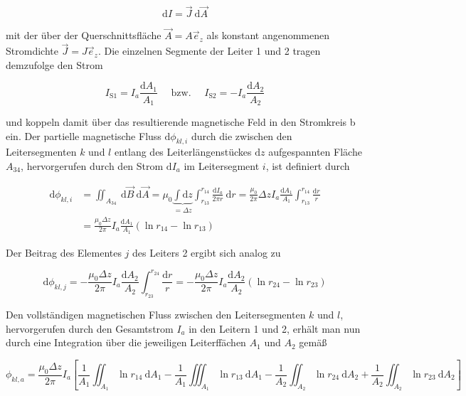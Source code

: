 \begin{equation}
	\mathrm{d} I=\vec{J} \mathrm{~d} \vec{A} 
\end{equation}


mit der über der Querschnittsfläche $\vec{A}=A \vec{e}_{z}$ als konstant angenommenen Stromdichte $\vec{J}=J \vec{e}_{z}$. Die einzelnen Segmente der Leiter 1 und 2 tragen demzufolge den Strom


\begin{equation}
	I_{\mathrm{S} 1}=I_{a} \frac{\mathrm{d} A_{1}}{A_{1}} \quad \text { bzw. } \quad I_{\mathrm{S} 2}=-I_{a} \frac{\mathrm{d} A_{2}}{A_{2}} 
\end{equation}


und koppeln damit über das resultierende magnetische Feld in den Stromkreis b ein. Der partielle magnetische Fluss $\mathrm{d} \phi_{k l, i}$ durch die zwischen den Leitersegmenten $k$ und $l$ entlang des Leiterlängenstückes $\mathrm{d} z$ aufgespannten Fläche $A_{34}$, hervorgerufen durch den Strom $\mathrm{d} I_{a}$ im Leitersegment $i$, ist definiert durch


\begin{align}
	\mathrm{d} \phi_{k l, i} & =\iint_{A_{34}} \mathrm{~d} \vec{B} \mathrm{~d} \vec{A}=\mu_{0} \underbrace{\int \mathrm{d} z}_{=\Delta z} \int_{r_{13}}^{r_{14}} \frac{\mathrm{d} I_{a}}{2 \pi r} \mathrm{~d} r=\frac{\mu_{0}}{2 \pi} \Delta z I_{a} \frac{\mathrm{d} A_{1}}{A_{1}} \int_{r_{13}}^{r_{14}} \frac{\mathrm{d} r}{r}  \\
	& =\frac{\mu_{0} \Delta z}{2 \pi} I_{a} \frac{\mathrm{d} A_{1}}{A_{1}}\left(\ln r_{14}-\ln r_{13}\right) 
\end{align}


Der Beitrag des Elementes $j$ des Leiters 2 ergibt sich analog zu


\begin{equation}
	\mathrm{d} \phi_{k l, j}=-\frac{\mu_{0} \Delta z}{2 \pi} I_{a} \frac{\mathrm{d} A_{2}}{A_{2}} \int_{r_{23}}^{r_{24}} \frac{\mathrm{d} r}{r}=-\frac{\mu_{0} \Delta z}{2 \pi} I_{a} \frac{\mathrm{d} A_{2}}{A_{2}}\left(\ln r_{24}-\ln r_{23}\right) 
\end{equation}

Den vollständigen magnetischen Fluss zwischen den Leitersegmenten $k$ und $l$, hervorgerufen durch den Gesamtstrom $I_{a}$ in den Leitern 1 und 2, erhält man nun durch eine Integration über die jeweiligen Leiterffächen $A_{1}$ und $A_{2}$ gemäß


\begin{equation}
	\phi_{k l, a}=\frac{\mu_{0} \Delta z}{2 \pi} I_{a}\left[\frac{1}{A_{1}} \iint_{A_{1}} \ln r_{14} \mathrm{~d} A_{1}-\frac{1}{A_{1}} \iiint_{A_{1}} \ln r_{13} \mathrm{~d} A_{1}-\frac{1}{A_{2}} \iint_{A_{2}} \ln r_{24} \mathrm{~d} A_{2}+\frac{1}{A_{2}} \iint_{A_{2}} \ln r_{23} \mathrm{~d} A_{2}\right] 
\end{equation}


